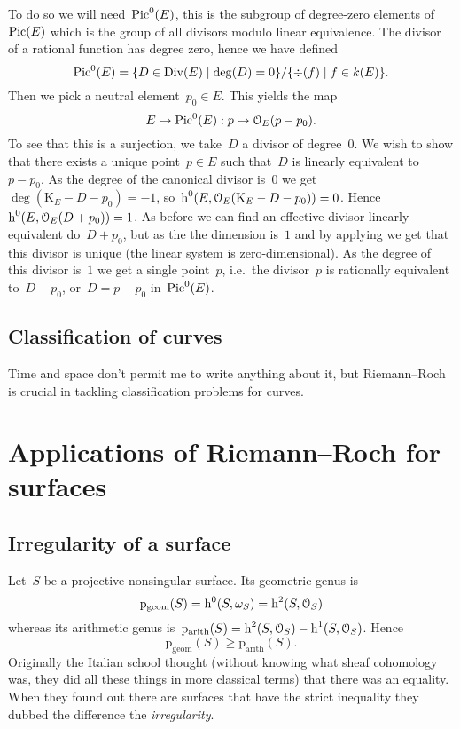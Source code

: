 \documentclass[10pt,a4paper]{article}
\begin{document}
To do so we will need~$\operatorname{Pic}^0(E)$, this is the subgroup of degree-zero elements of~$\operatorname{Pic}(E)$ which is the group of all divisors modulo linear equivalence. The divisor of a rational function has degree zero, hence we have defined
\begin{equation}
  \operatorname{Pic}^0(E)=\{D\in\operatorname{Div}(E)\mid\deg(D)=0\}/\{\div(f)\mid f\in k(E)\}.
\end{equation}
Then we pick a neutral element~$p_0\in E$. This yields the map
\begin{equation}
  E\mapsto\operatorname{Pic}^0(E):p\mapsto\mathcal{O}_E(p-p_0).
\end{equation}
To see that this is a surjection, we take~$D$ a divisor of degree~$0$. We wish to show that there exists a unique point~$p\in E$ such that~$D$ is linearly equivalent to~$p-p_0$. As the degree of the canonical divisor is~$0$ we get~$\deg(\mathrm{K}_E-D-p_0)=-1$, so~$\operatorname{h}^0(E,\mathcal{O}_E(\mathrm{K}_E-D-p_0))=0$. Hence~$\operatorname{h}^0(E,\mathcal{O}_E(D+p_0))=1$. As before we can find an effective divisor linearly equivalent do~$D+p_0$, but as the the dimension is~$1$ and by applying \cite[proposition II.7.7]{hartshorne-algebraic-geometry} we get that this divisor is unique (the linear system is zero-dimensional). As the degree of this divisor is~$1$ we get a single point~$p$, i.e.\ the divisor~$p$ is rationally equivalent to~$D+p_0$, or~$D=p-p_0$ in~$\operatorname{Pic}^0(E)$.

\subsection{Classification of curves}
Time and space don't permit me to write anything about it, but Riemann--Roch is crucial in tackling classification problems for curves.


\section{Applications of Riemann--Roch for surfaces}
\label{section:applications-surfaces}
\subsection{Irregularity of a surface}
Let~$S$ be a projective nonsingular surface. Its geometric genus is
\begin{equation}
  \mathrm{p}_{\mathrm{geom}}(S)=\operatorname{h}^0(S,\omega_S)=\operatorname{h}^2(S,\mathcal{O}_S) 
\end{equation}
whereas its arithmetic genus is~$\mathrm{p}_{\mathrm{arith}}(S)=\operatorname{h}^2(S,\mathcal{O}_S)-\operatorname{h}^1(S,\mathcal{O}_S)$. Hence
\begin{equation}
  \mathrm{p}_{\mathrm{geom}}(S)\geq\mathrm{p}_{\mathrm{arith}}(S) .
\end{equation}
Originally the Italian school thought (without knowing what sheaf cohomology was, they did all these things in more classical terms) that there was an equality. When they found out there are surfaces that have the strict inequality they dubbed the difference the \emph{irregularity}.
\end{document}
